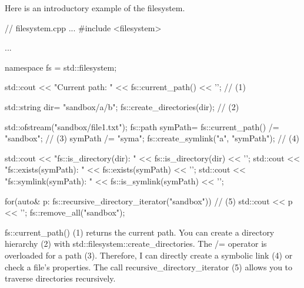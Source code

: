 Here is an introductory example of the filesystem.


\begin{cpp}
// filesystem.cpp
...
#include <filesystem>

...

namespace fs = std::filesystem;

std::cout << "Current path: " << fs::current_path() << '\n'; // (1)

std::string dir= "sandbox/a/b";
fs::create_directories(dir); // (2)

std::ofstream("sandbox/file1.txt");
fs::path symPath= fs::current_path() /= "sandbox"; // (3)
symPath /= "syma";
fs::create_symlink("a", "symPath"); // (4)

std::cout << "fs::is_directory(dir): " << fs::is_directory(dir) << '\n';
std::cout << "fs::exists(symPath): " << fs::exists(symPath) << '\n';
std::cout << "fs::symlink(symPath): " << fs::is_symlink(symPath) << '\n';

for(auto& p: fs::recursive_directory_iterator("sandbox")){ // (5)
	std::cout << p << '\n';
}
fs::remove_all("sandbox");
\end{cpp}

fs::current\_path() (1) returns the current path. You can create a directory hierarchy (2) with std::filesystem::create\_directories. The /= operator is overloaded for a path (3). Therefore, I can directly create a symbolic link (4) or check a file’s properties. The call recursive\_directory\_iterator (5) allows you to traverse directories recursively.
































